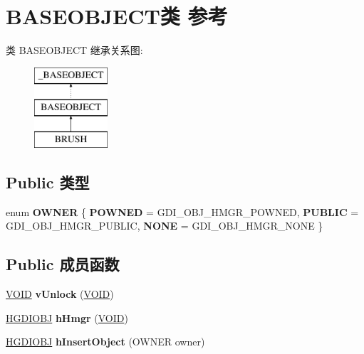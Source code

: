 \hypertarget{class_b_a_s_e_o_b_j_e_c_t}{}\section{B\+A\+S\+E\+O\+B\+J\+E\+C\+T类 参考}
\label{class_b_a_s_e_o_b_j_e_c_t}
类 B\+A\+S\+E\+O\+B\+J\+E\+CT 继承关系图\+:\begin{figure}[H]
\begin{center}
\leavevmode
\includegraphics[height=3.000000cm]{class_b_a_s_e_o_b_j_e_c_t}
\end{center}
\end{figure}
\subsection*{Public 类型}
\begin{DoxyCompactItemize}
\item 
\mbox{\label{class_b_a_s_e_o_b_j_e_c_t_a2e62fa85dab00defd1e38b140ab439de}} 
enum {\bfseries O\+W\+N\+ER} \{ {\bfseries P\+O\+W\+N\+ED} = G\+D\+I\+\_\+\+O\+B\+J\+\_\+\+H\+M\+G\+R\+\_\+\+P\+O\+W\+N\+ED, 
{\bfseries P\+U\+B\+L\+IC} = G\+D\+I\+\_\+\+O\+B\+J\+\_\+\+H\+M\+G\+R\+\_\+\+P\+U\+B\+L\+IC, 
{\bfseries N\+O\+NE} = G\+D\+I\+\_\+\+O\+B\+J\+\_\+\+H\+M\+G\+R\+\_\+\+N\+O\+NE
 \}
\end{DoxyCompactItemize}
\subsection*{Public 成员函数}
\begin{DoxyCompactItemize}
\item 
\mbox{\label{class_b_a_s_e_o_b_j_e_c_t_a15c1e65ae4069215c81262e667fc35b8}} 
\hyperlink{interfacevoid}{V\+O\+ID} {\bfseries v\+Unlock} (\hyperlink{interfacevoid}{V\+O\+ID})
\item 
\mbox{\label{class_b_a_s_e_o_b_j_e_c_t_a149f8af240550112e79bfd1a52cf1aae}} 
\hyperlink{interfacevoid}{H\+G\+D\+I\+O\+BJ} {\bfseries h\+Hmgr} (\hyperlink{interfacevoid}{V\+O\+ID})
\item 
\mbox{\label{class_b_a_s_e_o_b_j_e_c_t_a1d411ca4642a1a3a6a228533818d8bbf}} 
\hyperlink{interfacevoid}{H\+G\+D\+I\+O\+BJ} {\bfseries h\+Insert\+Object} (O\+W\+N\+ER owner)
\end{DoxyCompactItemize}
